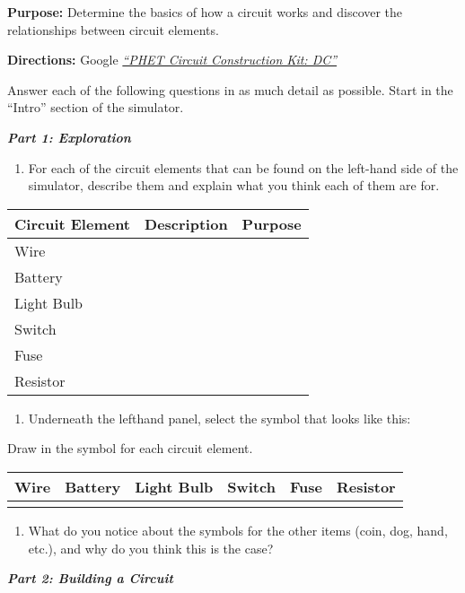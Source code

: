 \documentclass[11pt]{article}
\date{}
\begin{document}
\textbf{Purpose:} Determine the basics of how a circuit works and
discover the relationships between circuit elements.

\textbf{Directions:} Google
\href{https://phet.colorado.edu/en/simulations/circuit-construction-kit-dc}{\emph{``PHET
Circuit Construction Kit: DC''}}

Answer each of the following questions in as much detail as possible.
Start in the ``Intro'' section of the simulator.

\textbf{\emph{Part 1: Exploration}}

\begin{enumerate}
\def\labelenumi{\Alph{enumi}.}
\item
  For each of the circuit elements that can be found on the left-hand
  side of the simulator, describe them and explain what you think each
  of them are for.
\end{enumerate}

\begin{longtable}[]{@{}lll@{}}
\toprule
\textbf{Circuit Element} & \textbf{Description} &
\textbf{Purpose}\tabularnewline
\midrule
\endhead
Wire & &\tabularnewline
Battery & &\tabularnewline
Light Bulb & &\tabularnewline
Switch & &\tabularnewline
Fuse & &\tabularnewline
Resistor & &\tabularnewline
\bottomrule
\end{longtable}

\begin{enumerate}
\def\labelenumi{\Alph{enumi}.}
\item
  Underneath the lefthand panel, select the symbol that looks like this:
\end{enumerate}

Draw in the symbol for each circuit element.

\begin{longtable}[]{@{}llllll@{}}
\toprule
\textbf{Wire} & \textbf{Battery} & \textbf{Light Bulb} & \textbf{Switch}
& \textbf{Fuse} & \textbf{Resistor}\tabularnewline
\midrule
\endhead
& & & & &\tabularnewline
\bottomrule
\end{longtable}

\begin{enumerate}
\def\labelenumi{\roman{enumi}.}
\item
  What do you notice about the symbols for the other items (coin, dog,
  hand, etc.), and why do you think this is the case?
\end{enumerate}

\textbf{\emph{Part 2: Building a Circuit}}
\end{document}
